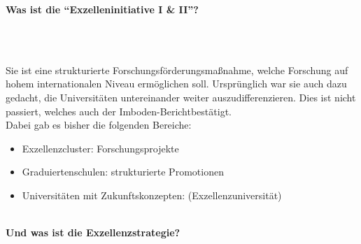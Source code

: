 \documentclass[DIV=calc]{scrartcl}
\begin{document}
    \vspace{1cm}    
\textbf{Was ist die "`Exzelleninitiative I \& II"'?}\\\\
\begin{minipage}{0.05\textwidth}
~ %
\end{minipage}
\begin{minipage}{0.95\textwidth}
Sie ist eine strukturierte Forschungsförderungsmaßnahme, welche Forschung auf hohem
internationalen Niveau ermöglichen soll. Ursprünglich war sie auch dazu gedacht, die Universitäten
untereinander weiter auszudifferenzieren. Dies ist nicht passiert, welches auch der Imboden-Bericht\footnotemark[1] bestätigt.\\
Dabei gab es bisher die folgenden Bereiche:
\begin{itemize}
\item Exzellenzcluster: Forschungsprojekte
\item Graduiertenschulen: strukturierte Promotionen
\item Universitäten mit Zukunftskonzepten: (\glq Exzellenzuniversität\grq)
\end{itemize}
\end{minipage}\vspace{2\baselineskip}\\
\textbf{Und was ist die Exzellenzstrategie?}\\\\
\begin{minipage}{0.05\textwidth}
~ %
\end{minipage}
\end{document}

